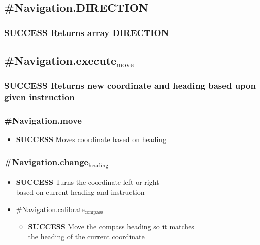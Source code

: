 \documentclass{article}
\begin{document}
\subsection{\#Navigation.DIRECTION}
\label{sec-7-3}
\subsubsection{\textbf{SUCCESS} Returns array DIRECTION}
\label{sec-7-3-1}
\subsection{\#Navigation.execute$_{\mathrm{move}}$}
\label{sec-7-4}
\subsubsection{\textbf{SUCCESS} Returns new coordinate and heading based upon given instruction}
\label{sec-7-4-1}
\subsubsection{\#Navigation.move}
\label{sec-7-4-2}
\begin{itemize}

\item \textbf{SUCCESS} Moves coordinate based on heading\\
\label{sec-7-4-2-1}%
\end{itemize} %
\subsubsection{\#Navigation.change$_{\mathrm{heading}}$}
\label{sec-7-4-3}
\begin{itemize}

\item \textbf{SUCCESS} Turns the coordinate left or right\\
\label{sec-7-4-3-1}%
based on current heading and instruction

\item \#Navigation.calibrate$_{\mathrm{compass}}$
\label{sec-7-4-3-2}%
\begin{itemize}

\item \textbf{SUCCESS} Move the compass heading so it matches\\
\label{sec-7-4-3-2-1}%
the heading of the current coordinate
\end{itemize} %
\end{itemize} %
\end{document}
